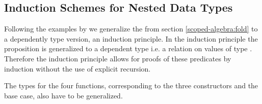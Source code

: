 \subsection{Induction Schemes for Nested Data Types}
\label{scoped-algebra:ind}

Following the examples by \textcite{DBLP:journals/corr/abs-1806-05230} we
generalize the  from section \ref{scoped-algebra:fold} to a
dependently type version, an induction principle.
In the induction principle the proposition  is generalized to a
dependent type i.e. a relation on values of type 
\AgdaSpace{}\AgdaSpace{}.
Therefore the induction principle allows for proofs of these predicates by
induction without the use of explicit recursion.

The types for the four functions, corresponding to the three constructors and
the base case, also have to be generalized.

